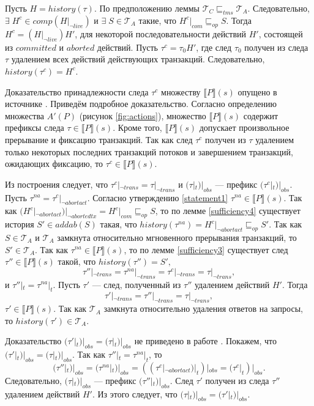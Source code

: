 \begin{myproof}
Пусть $H = history(\tau)$. По предположению леммы $\mathcal{T}_C \sqsubseteq_{tms} \mathcal{T}_A$. Следовательно, $\exists \; H^c \in comp(H|_{\neg live})$ и $\exists \; S \in \mathcal{T}_A$ такие, что $H^c|_{com} \sqsubseteq_{op} S$. Тогда $H^c = (H|_{\neg live})H'$, для некоторой последовательности действий $H'$, состоящей из $committed$ и $aborted$ действий.  Пусть $\tau^c = \tau_0H'$, где след $\tau_0$ получен из следа $\tau$ удалением всех действий действующих транзакций. Следовательно, $history(\tau^c) = H^c$.

Доказательство принадлежности следа $\tau^c$ множеству $\llbracket P \rrbracket(s)$ опущено в источнике \cite{tms_article}. Приведём подробное доказательство. Согласно определению множества $A'(P)$ (рисунок \ref{fig:actions}), множество $\llbracket P\rrbracket(s)$ содержит префиксы следа $\tau \in \llbracket P\rrbracket(s)$. Кроме того, $\llbracket P\rrbracket(s)$ допускает произвольное прерывание и фиксацию транзакций. Так как след $\tau^c$ получен из $\tau$ удалением только некоторых последних транзакций потоков и завершением транзакций, ожидающих фиксацию, то $\tau^c \in \llbracket P\rrbracket(s)$. 

Из построения следует, что $\tau^c|_{\neg trans} = \tau|_{\neg trans}$ и $(\tau|_t)|_{obs}$ --- префикс $(\tau^c|_t)|_{obs}$. Пусть $\tau^{na} = \tau^c|_{\neg abortact}$. Согласно утверждению \ref{statement1} $\tau^{na} \in \llbracket P \rrbracket(s)$. Так как $(H^c|_{\neg abortact})|_{\neg abortedtx} = H^c|_{com} \sqsubseteq_{op} S$, то по лемме \ref{sufficiency4}
существует история $S' \in addab(S)$ такая, что $history(\tau^{na}) = H^c|_{\neg abortact} \sqsubseteq_{op} S'$. Так как $S \in \mathcal{T}_A$ и $\mathcal{T}_A$ замкнута относительно мгновенного прерывания транзакций, то $S' \in \mathcal{T}_A$. Так как $\tau^{na} \in \llbracket P \rrbracket(s)$, то по лемме \ref{sufficiency3} существует след $\tau'' \in \llbracket P \rrbracket(s)$ такой, что $history(\tau'') = S',$ $$\tau''|_{\neg trans} = \tau^{na}|_{\neg trans} = \tau^c|_{\neg trans} = \tau|_{\neg trans},$$ и $\tau''|_t = \tau^{na}|_t$. Пусть $\tau'$ --- след, полученный из $\tau''$ удалением действий $H'$. Тогда $$\tau'|_{\neg trans} = \tau''|_{\neg trans} = \tau|_{\neg trans},$$ $\tau' \in \llbracket P\rrbracket(s)$. Так как $\mathcal{T}_A$ замкнута относительно удаления ответов на запросы, то $history(\tau') \in \mathcal{T}_A$.

Доказательство $(\tau'|_t)|_{obs} = (\tau|_t)|_{obs}$ не приведено в работе \cite{tms_article}. Покажем, что $(\tau'|_t)|_{obs} = (\tau|_t)|_{obs}$. Так как $\tau''|_t = \tau^{na}|_t$, то $$(\tau''|_t)|_{obs} = (\tau^{na}|_t)|_{obs} = ((\tau^c|_{\neg abortact})|_t)|_{obs} = (\tau^c|_t)|_{obs}.$$ Следовательно, $(\tau|_t)|_{obs}$ --- префикс $(\tau''|_t)|_{obs}$. След $\tau'$ получен из следа $\tau''$ удалением действий $H'$. Из этого следует, что $(\tau|_t)|_{obs} = (\tau'|_t)|_{obs}$.
\end{myproof}

